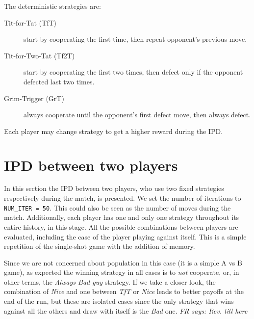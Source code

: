 \documentclass[journal,a4paper,10pt,twoside,draft]{IEEEtran}
\newcommand{\FR}[1]{\textit{\color{green}FR says: #1}}
\begin{document}
The deterministic strategies are:
\begin{description}
    \item[Tit-for-Tat (TfT)] start by cooperating the first time, then repeat opponent's previous move.
    \item[Tit-for-Two-Tat (Tf2T)] start by cooperating the first two times, then defect only if the opponent defected last two times.
    \item[Grim-Trigger (GrT)] always cooperate until the opponent's first defect move, then always defect. 
\end{description}

Each player may change strategy to get a higher reward during the IPD.

\section{IPD between two players} \label{IPD2P}
In this section the IPD between two players, who use two fixed strategies respectively during the match, is presented.
We set the number of iterations to \texttt{NUM\_ITER = 50}. This could also be seen as the number of moves during the match.
Additionally, each player has one and only one strategy throughout its entire history, in this stage.
All the possible combinations between players are evaluated, including the case of the player playing against itself.
This is a simple repetition of the single-shot game with the addition of memory.

Since we are not concerned about population in this case (it is a simple A vs B game), as expected the winning strategy in all cases is to \textit{not} cooperate, or, in other terms, the \textit{Always Bad guy} strategy.
If we take a closer look, the combination of \textit{Nice} and one between \textit{TfT} or \textit{Nice} leads to better payoffs at the end of the run, but these are isolated cases since the only strategy that wins against all the others and draw with itself is the \textit{Bad} one.
\FR{Rev. till here}
\end{document}
